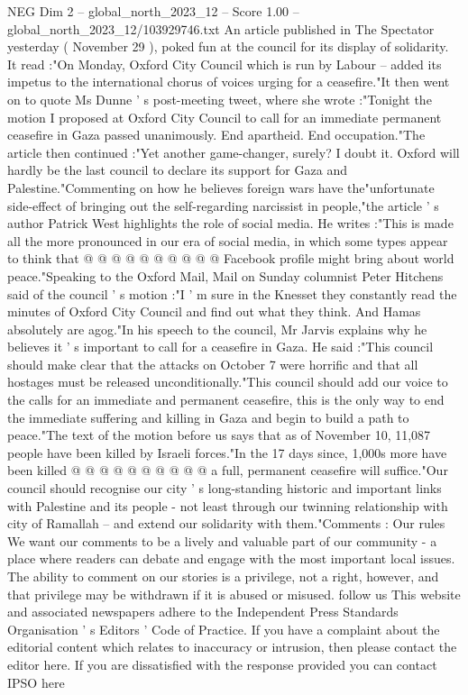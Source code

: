 \begin{textsample}{NEG Dim 2 – global\_north\_2023\_12 – Score 1.00 – global\_north\_2023\_12/103929746.txt}  \label{ex:f2_neg_204}
An article published in The Spectator yesterday ( November 29 ), poked fun at the council for its display of solidarity.
It read :"On Monday, Oxford City Council which is run by Labour -- added its impetus to the international chorus of voices urging for a ceasefire."It then went on to quote Ms Dunne ' s post-meeting tweet, where she wrote :"Tonight the motion I proposed at Oxford City Council to call for an immediate permanent ceasefire in Gaza passed unanimously.
End apartheid.
End occupation."The article then continued :"Yet another game-changer, surely?
I doubt it.
Oxford will hardly be the last council to declare its support for Gaza and Palestine."Commenting on how he believes foreign wars have the"unfortunate side-effect of bringing out the self-regarding narcissist in people,"the article ' s author Patrick West highlights the role of social media.
He writes :"This is made all the more pronounced in our era of social media, in which some types appear to think that @ @ @ @ @ @ @ @ @ @ Facebook profile might bring about world peace."Speaking to the Oxford Mail, Mail on Sunday columnist Peter Hitchens said of the council ' s motion :"I ' m sure in the Knesset they constantly read the minutes of Oxford City Council and find out what they think.
And Hamas absolutely are agog."In his speech to the council, Mr Jarvis explains why he believes it ' s important to call for a ceasefire in Gaza.
He said :"This council should make clear that the attacks on October 7 were horrific and that all hostages must be released unconditionally."This council should add our voice to the calls for an immediate and permanent ceasefire, this is the only way to end the immediate suffering and killing in Gaza and begin to build a path to peace."The text of the motion before us says that as of November 10, 11,087 people have been killed by Israeli forces."In the 17 days since, 1,000s more have been killed @ @ @ @ @ @ @ @ @ @ a full, permanent ceasefire will suffice."Our council should recognise our city ' s long-standing historic and important links with Palestine and its people - not least through our twinning relationship with city of Ramallah -- and extend our solidarity with them."Comments : Our rules We want our comments to be a lively and valuable part of our community - a place where readers can debate and engage with the most important local issues.
The ability to comment on our stories is a privilege, not a right, however, and that privilege may be withdrawn if it is abused or misused. follow us This website and associated newspapers adhere to the Independent Press Standards Organisation ' s Editors ' Code of Practice.
If you have a complaint about the editorial content which relates to inaccuracy or intrusion, then please contact the editor here.
If you are dissatisfied with the response provided you can contact IPSO here

\end{textsample}
